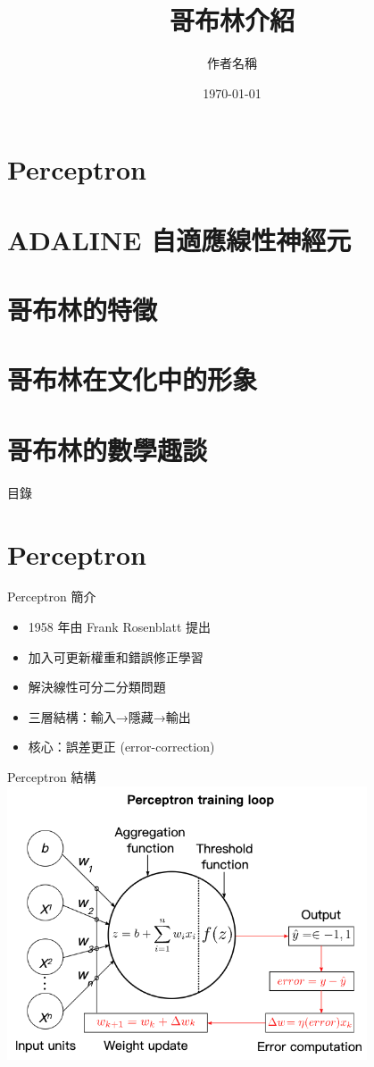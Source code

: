 \documentclass{beamer}
\title{哥布林介紹}
\author{作者名稱}
\date{\today}
\begin{document}
\begin{frame}
  \titlepage
\end{frame}

\section{Perceptron}
\section{ADALINE 自適應線性神經元}
\section{哥布林的特徵}
\section{哥布林在文化中的形象}
\section{哥布林的數學趣談}

\begin{frame}{目錄}
  \tableofcontents
\end{frame}

\section{Perceptron}
\begin{frame}{Perceptron 簡介}
  \begin{itemize}
    \item 1958 年由 Frank Rosenblatt 提出
    \item 加入可更新權重和錯誤修正學習
    \item 解決線性可分二分類問題
    \item 三層結構：輸入→隱藏→輸出
    \item 核心：誤差更正 (error-correction)
  \end{itemize}
\end{frame}

\begin{frame}{Perceptron 結構}
  \centering
  \includegraphics[width=0.8\textwidth]{perceptron_pic.png}
\end{frame}
\end{document}
